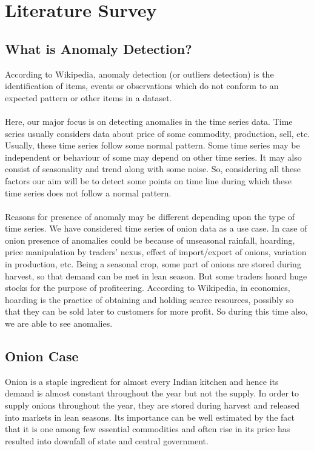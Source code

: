 \chapter{Literature Survey}


\section{What is Anomaly Detection?}

According to Wikipedia, anomaly detection (or outliers detection) is the identification of items, events or observations which do not conform to an expected pattern or other items in a dataset.\\
\\
Here, our major focus is on detecting anomalies in the time series data. Time series usually considers data about price of some commodity, production, sell, etc. Usually, these time series follow some normal pattern. Some time series may be independent or behaviour of some may depend on other time series. It may also consist of seasonality and trend along with some noise. So, considering all these factors our aim will be to detect some points on time line during which these time series does not follow a normal pattern.\\
\\
Reasons for presence of anomaly may be different depending upon the type of time series. We have considered time series of onion data as a use case. In case of onion presence of anomalies could be because of unseasonal rainfall, hoarding, price manipulation by traders' nexus, effect of import/export of onions, variation in production, etc. Being a seasonal crop, some part of onions are stored during harvest, so that demand can be met in lean season. But some traders hoard huge stocks for the purpose of profiteering. According to Wikipedia, in economics, hoarding is the practice of obtaining and holding scarce resources, possibly so that they can be sold later to customers for more profit. So during this time also, we are able to see anomalies.


\section{Onion Case}


Onion is a staple ingredient for almost every Indian kitchen and hence its demand is almost constant throughout the year but not the supply. In order to supply onions throughout the year, they are stored during harvest and released into markets in lean seasons. Its importance can be well estimated by the fact that it is one among few essential commodities and often rise in its price has resulted into downfall of state and central government.


